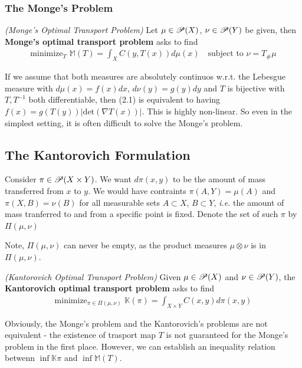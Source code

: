 \documentclass[12pt,a4paper]{article}
\begin{document}
\subsubsection*{The Monge's Problem}

 \emph{(Monge's Optimal Transport Problem)} Let $\mu \in \mathscr{P} (X)$, $\nu \in \mathscr{P}(Y)$ be given, then \textbf{Monge's optimal transport problem} asks to find
\begin{align*}
\text{minimize}_T \,\,\mathbb{M}(T) = \int_X C(y, T(x)) d\mu(x) \quad \text{subject to } \nu = T_{\#} \mu
\end{align*}
\s

If we assume that both measures are absolutely continuos w.r.t. the Lebesgue measure with $d\mu(x) = f(x)dx$, $d\nu(y) = g(y)dy$ and $T$ is bijective with $T, T^{-1}$ both differentiable, then (2.1) is equivalent to having $f(x) = g(T(y)) |\text{det}(\nabla T(x))|$. This is highly non-linear. So even in the simplest setting, it is often difficult to solve the Monge's problem.

\subsection{The Kantorovich Formulation}

Consider $\pi \in \mathscr{P}(X\times Y)$. We want $d\pi(x,y)$ to be the amount of mass transferred from $x$ to $y$. We would have contraints $\pi(A, Y) = \mu(A)$ and $\pi(X, B) = \nu(B)$ for all measurable sets $A\subset X$, $B\subset Y$, \textit{i.e.} the amount of mass tranferred to and from a specific point is fixed. Denote the set of such $\pi$ by $\Pi(\mu,\nu)$

Note, $\Pi(\mu, \nu)$ can never be empty, as the product measures $\mu \otimes \nu$ is in $\Pi(\mu, \nu)$.
\s

 \emph{(Kantorovich Optimal Transport Problem)} Given $\mu \in \mathscr{P}(X)$ and $\nu \in \mathscr{P}(Y)$, the \textbf{Kantorovich optimal transport problem} asks to find 
\begin{align*}
\text{minimize}_{\pi \in \Pi(\mu, \nu)} \,\, \mathbb{K}(\pi) = \int_{X\times Y} C(x,y) d\pi(x,y)
\end{align*}
\s

Obviously, the Monge's problem and the Kantorovich's problems are not equivalent - the existence of trasport map $T$ is not guaranteed for the Monge's problem in the first place. However, we can establish an inequality relation betwenn $\inf \mathbb{K}{\pi}$ and $\inf \mathbb{M}(T)$.
\end{document}
